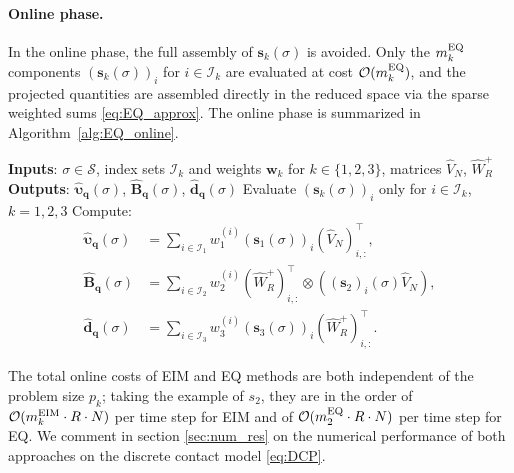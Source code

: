 \paragraph{Online phase.}
In the online phase, the full assembly of $\mathbf{s}_k(\sigma)$ is avoided. Only the $m_k^{\rm EQ}$ components $(\mathbf{s}_k(\sigma))_i$ for $i \in \mathcal{I}_k$ are evaluated at cost $\mathcal{O}(m_k^{\rm EQ})$, and the projected quantities are assembled directly in the reduced space via the sparse weighted sums \eqref{eq:EQ_approx}. The online phase is summarized in Algorithm~\ref{alg:EQ_online}.

\begin{algorithm}[h!]
\caption{Empirical Quadrature for the DCP  --- online phase}
\label{alg:EQ_online}
\begin{algorithmic}[1]
    \STATE \textbf{Inputs}: $\sigma \in \mathcal{S}$, index sets $\mathcal{I}_k$ and weights $\mathbf{w}_k$ for $k \in \{1,2,3\}$, matrices $\hat{V}_N$, $\hat{W}^+_R$
    \STATE \textbf{Outputs}: $\hat{\boldsymbol{\upsilon}}_{\mathbf{q}}(\sigma)$, $\hat{\mathbf{B}}_{\mathbf{q}}(\sigma)$, $\hat{\mathbf{d}}_{\mathbf{q}}(\sigma)$
    \STATE Evaluate $\left(\mathbf{s}_k(\sigma)\right)_i$ only for $i \in \mathcal{I}_k$, $k=1,2,3$ %
    \STATE Compute:
    \begin{align*}
        \hat{\boldsymbol{\upsilon}}_{\mathbf{q}}(\sigma) &= \sum_{i \in \mathcal{I}_1} w_1^{(i)} \left(\mathbf{s}_1(\sigma)\right)_i {(\hat{V}_N)}_{i,:}^\top, \\[4pt]
        \widehat{\mathbf{B}}_{\mathbf{q}}(\sigma) &= \sum_{i \in \mathcal{I}_2} w_2^{(i)} \left(\hat{W}_R^{+}\right)_{i,:}^\top \otimes \left({(\mathbf{s}_2)}_i(\sigma) \hat{V}_N\right), \\[4pt]
        \hat{\mathbf{d}}_{\mathbf{q}}(\sigma) &= \sum_{i \in \mathcal{I}_3} w_3^{(i)} \left(\mathbf{s}_3(\sigma)\right)_i {(\hat{W}_R^{+})}_{i,:}^\top.
    \end{align*}
\end{algorithmic}
\end{algorithm}

The total online costs of  EIM and EQ methods are both independent of the problem size $p_k$; taking the example of $s_2$, they are in the order of  $\mathcal{O}(m_k^{\rm EIM} \cdot R \cdot N)$ per time step for EIM and of $\mathcal{O}(m_2^{\rm EQ} \cdot R \cdot N)$  per time step for EQ. We comment in section \ref{sec:num_res} on the numerical performance of both approaches on the discrete contact model \eqref{eq:DCP}.
